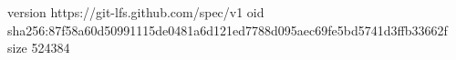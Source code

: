 version https://git-lfs.github.com/spec/v1
oid sha256:87f58a60d50991115de0481a6d121ed7788d095aec69fe5bd5741d3ffb33662f
size 524384
